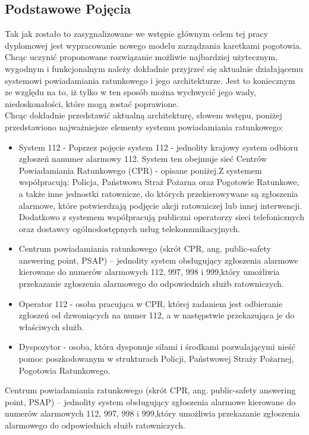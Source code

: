 \documentclass[12pt]{article} %
\begin{document}
\subsection{Podstawowe Pojęcia}
Tak jak zostało to zasygnalizowane we wstępie głównym celem tej pracy dyplomowej jest wypracowanie nowego modelu zarządzania karetkami pogotowia. Chcąc uczynić proponowane rozwiązanie możliwie najbardziej użytecznym, wygodnym i funkcjonalnym należy dokładnie przyjrzeć się aktualnie działającemu systemowi powiadamiania ratunkowego i jego architekturze. Jest to koniecznym ze względu na to, iż tylko w ten sposób można wychwycić jego wady, niedoskonałości, które mogą zostać poprawione.\\
Chcąc dokładnie przedstawić aktualną architekturę, słowem wstępu, poniżej przedstawiono najważniejsze elementy systemu powiadamiania ratunkowego:
\begin{itemize}
\item 
System 112 - 
Poprzez pojęcie system 112 - jednolity krajowy system odbioru zgłoszeń nanumer alarmowy 112. System ten obejmuje sieć Centrów Powiadamiania Ratunkowego (CPR) - opisane poniżej.Z systemem
współpracują: Policja, Państwowa Straż Pożarna oraz Pogotowie Ratunkowe, a także inne jednostki ratownicze, do których przekierowywane są zgłoszenia alarmowe, które potwierdzają podjęcie akcji ratowniczej lub innej interwencji. Dodatkowo z systemem współpracują publiczni operatorzy sieci telefonicznych oraz
dostawcy ogólnodostępnych usług telekomunikacyjnych.
\item 
Centrum powiadamiania ratunkowego (skrót CPR, ang. public-safety answering point, PSAP) – jednolity system obsługujący zgłoszenia alarmowe kierowane do numerów alarmowych 112, 997, 998 i 999,który  umożliwia przekazanie zgłoszenia alarmowego do odpowiednich służb ratowniczych. 

\item 
Operator 112 - osoba pracująca w CPR, której zadaniem jest odbieranie zgłoszeń od dzwoniących na numer 112, a w następstwie przekazująca je do właściwych służb.
\item 
Dyspozytor - osoba, która dysponuje siłami i środkami pozwalającymi nieść pomoc poszkodowanym w strukturach Policji, Państwowej Straży Pożarnej, Pogotowia Ratunkowego.


\end{itemize}
Centrum powiadamiania ratunkowego (skrót CPR, ang. public-safety answering point, PSAP) – jednolity system obsługujący zgłoszenia alarmowe kierowane do numerów alarmowych 112, 997, 998 i 999,który  umożliwia przekazanie zgłoszenia alarmowego do odpowiednich służb ratowniczych. 
\end{document}
